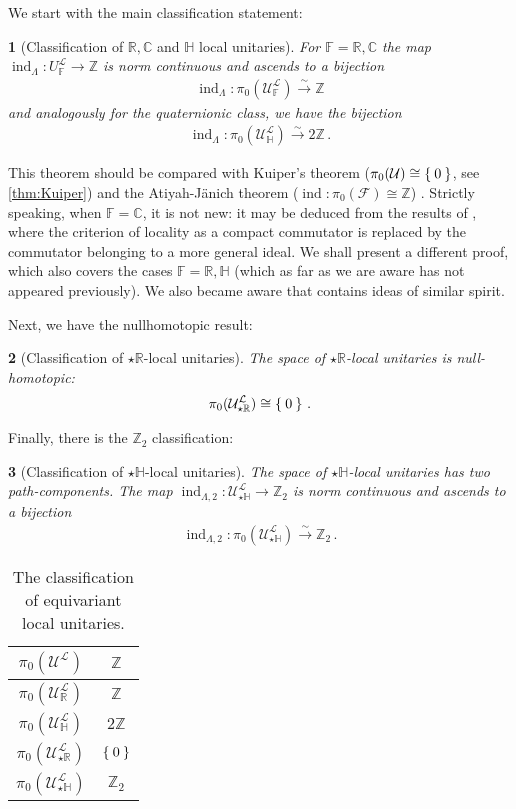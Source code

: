 \documentclass[a4paper,10pt]{article}
\numberwithin{equation}{section}
\theoremstyle{plain}
\newtheorem{thm}{\protect\theoremname}[section]
\theoremstyle{plain}
\theoremstyle{plain}
\theoremstyle{plain}
\theoremstyle{plain}
\theoremstyle{remark}
\theoremstyle{definition}
\theoremstyle{plain}
\providecommand{\theoremname}{Theorem}
\newcommand{\ZZ}{\mathbb{Z}}
\newcommand{\RR}{\mathbb{R}}
\newcommand{\CC}{\mathbb{C}}
\newcommand{\FF}{\mathbb{F}}
\newcommand{\calF}{\mathcal{F}}
\newcommand{\calU}{\mathcal{U}}
\newcommand{\calL}{\mathcal{L}}
\newcommand{\HH}{\mathbb{H}}
\newcommand{\findex}{\operatorname{ind}}
\newcommand{\eql}[1]{\begin{align}#1\end{align}}
\begin{document}
	We start with the main classification statement:
	\begin{thm}[Classification of $\RR,\CC$ and $\HH$ local unitaries]\label{thm:classification of RCH local unitaries} For $\FF=\RR,\CC$ the map $\findex_\Lambda:U_\FF^\calL\to\ZZ$ is norm continuous and ascends to a bijection \eql{\findex_\Lambda:\pi_0(\calU_\FF^\calL)\xrightarrow{\sim}\ZZ}  and analogously for the quaternionic class, we have the bijection\eql{\findex_\Lambda:\pi_0(\calU_\HH^\calL)\xrightarrow{\sim}2\ZZ\,.}
	\end{thm}
	This theorem should be compared with Kuiper's theorem ($\pi_0(\calU)\cong\Set{0}$, see \cref{thm:Kuiper}) and the Atiyah-J\"anich theorem ($\findex:\pi_0(\calF)\cong\ZZ$) \cite{Booss_Topology_and_Analysis}. Strictly speaking, when $\FF=\CC$, it is not new: it may be deduced from the results of \cite{CareyHurstOBrien1982}, where the criterion of locality as a compact commutator is replaced by the commutator belonging to a more general ideal.
	We shall present a different proof, which also covers the cases $\FF=\RR,\HH$ (which as far as we are aware has not appeared previously). We also became aware that \cite{Geib2022} contains ideas of similar spirit.
	
	Next, we have the nullhomotopic result:
	\begin{thm}[Classification of $\star\RR$-local unitaries]\label{thm:star-real local unitaries} The space of $\star\RR$-local unitaries is null-homotopic: \eql{\pi_0(\calU_{\star\RR}^\calL)\cong\Set{0}\,.}
	\end{thm}
	
	Finally, there is the $\ZZ_2$ classification:
	\begin{thm}[Classification of $\star\HH$-local unitaries]\label{thm:star-quaternionic local unitaries} The space of $\star\HH$-local unitaries has two path-components. The map $\findex_{\Lambda,2}:\calU_{\star\HH}^\calL\to\ZZ_2$ is norm continuous and ascends to a bijection \eql{\findex_{\Lambda,2}:\pi_0(\calU_{\star\HH}^\calL)\xrightarrow{\sim}\ZZ_2\,.}
	\end{thm}
	\begin{table}
		\begin{center}
			\begin{tabular}{|c|c|}
				\hline
				$\pi_0(\calU^\calL)$ & $\ZZ$\\\hline
				$\pi_0(\calU_\RR^\calL)$ & $\ZZ$\\\hline
				$\pi_0(\calU_\HH^\calL)$ & $2\ZZ$\\\hline
				$\pi_0(\calU_{\star\RR}^\calL)$ & $\Set{0}$\\\hline
				$\pi_0(\calU_{\star\HH}^\calL)$ & $\ZZ_2$\\
				\hline
			\end{tabular}
		\end{center}
		\caption{The classification of equivariant local unitaries.}
		\label{table:equivariant local unitaries}
	\end{table}
	
\end{document}
